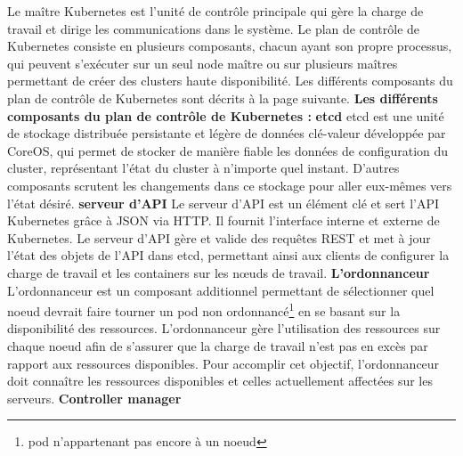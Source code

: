 \documentclass{article}
\begin{document}
Le maître Kubernetes est l'unité de contrôle principale qui gère la charge de travail et dirige les communications dans le système. Le plan de contrôle de Kubernetes consiste en plusieurs composants, chacun ayant son propre processus, qui peuvent s'exécuter sur un seul node maître ou sur plusieurs maîtres permettant de créer des clusters haute disponibilité. Les différents composants du plan de contrôle de Kubernetes sont décrits à la page suivante.
\newpage
\textbf{Les différents composants du plan de contrôle de Kubernetes : }
\newline
\newline
\textbf{etcd}
\newline
\newline
etcd est une unité de stockage distribuée persistante et légère de données clé-valeur développée par CoreOS, qui permet de stocker de manière fiable les données de configuration du cluster, représentant l'état du cluster à n'importe quel instant. D'autres composants scrutent les changements dans ce stockage pour aller eux-mêmes vers l'état désiré.
\newline
\newline
\textbf{serveur d'API}
\newline
\newline
Le serveur d'API est un élément clé et sert l'API Kubernetes grâce à JSON via HTTP. Il fournit l'interface interne et externe de Kubernetes. Le serveur d'API gère et valide des requêtes REST et met à jour l'état des objets de l'API dans etcd, permettant ainsi aux clients de configurer la charge de travail et les containers sur les nœuds de travail.
\newline
\newline
\textbf{L'ordonnanceur}
\newline
\newline
L'ordonnanceur est un composant additionnel permettant de sélectionner quel noeud devrait faire tourner un pod non ordonnancé\footnote{pod n'appartenant pas encore à un noeud} en se basant sur la disponibilité des ressources. L'ordonnanceur gère l'utilisation des ressources sur chaque noeud afin de s'assurer que la charge de travail n'est pas en excès par rapport aux ressources disponibles. Pour accomplir cet objectif, l'ordonnanceur doit connaître les ressources disponibles et celles actuellement affectées sur les serveurs.
\newline
\newline
\textbf{Controller manager}
\newline
\newline
\end{document}
